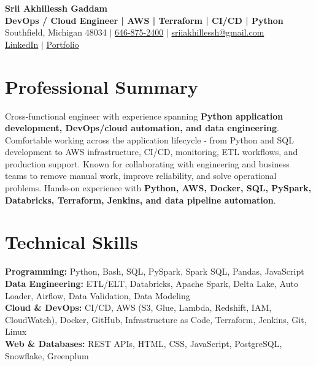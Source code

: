\documentclass[letterpaper,10pt]{article}
\begin{document}
\fontsize{9.35pt}{10.45pt}\selectfont

\begin{center}
    {\LARGE \textbf{Srii Akhillessh Gaddam}} \\[-1pt]
    \textbf{DevOps / Cloud Engineer | AWS | Terraform | CI/CD | Python} \\[2pt]
    Southfield, Michigan 48034 $|$
    \href{tel:6468752400}{646-875-2400} $|$
    \href{mailto:sriiakhillessh@gmail.com}{sriiakhillessh@gmail.com} \\[1pt]
    \href{https://www.linkedin.com/in/srii-akhiilessh-gaddam-b48668191/}{LinkedIn} $|$
    \href{https://sriiakhillesshg.github.io/portfolio/}{Portfolio}
\end{center}
\vspace{-8pt}

\section{Professional Summary}
\small{Cross-functional engineer with experience spanning \textbf{Python application development, DevOps/cloud automation, and data engineering}. Comfortable working across the application lifecycle - from Python and SQL development to AWS infrastructure, CI/CD, monitoring, ETL workflows, and production support. Known for collaborating with engineering and business teams to remove manual work, improve reliability, and solve operational problems. Hands-on experience with \textbf{Python, AWS, Docker, SQL, PySpark, Databricks, Terraform, Jenkins, and data pipeline automation}.}

\section{Technical Skills}
\small{
\textbf{Programming:} Python, Bash, SQL, PySpark, Spark SQL, Pandas, JavaScript \\
\textbf{Data Engineering:} ETL/ELT, Databricks, Apache Spark, Delta Lake, Auto Loader, Airflow, Data Validation, Data Modeling \\
\textbf{Cloud \& DevOps:} CI/CD, AWS (S3, Glue, Lambda, Redshift, IAM, CloudWatch), Docker, GitHub, Infrastructure as Code, Terraform, Jenkins, Git, Linux \\
\textbf{Web \& Databases:} REST APIs, HTML, CSS, JavaScript, PostgreSQL, Snowflake, Greenplum
}
\end{document}
